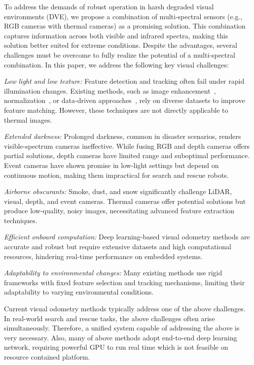 To address the demands of robust operation in harsh degraded visual environments (DVE), we propose a combination of multi-spectral sensors (e.g., RGB cameras with thermal cameras) as a promising solution. This combination captures information across both visible and infrared spectra, making this solution better suited for extreme conditions. Despite the advantages, several challenges must be overcome to fully realize the potential of a multi-spectral combination. In this paper, we address the following key visual challenges:

\textit{Low light and low texture:} Feature detection and tracking often fail under rapid illumination changes. Existing methods, such as image enhancement~\cite{gomez2018learning}, normalization~\cite{buczko2016flow}, or data-driven approaches~\cite{wang2017deepvo}, rely on diverse datasets to improve feature matching. However, these techniques are not directly applicable to thermal images.

\textit{Extended darkness:} Prolonged darkness, common in disaster scenarios, renders visible-spectrum cameras ineffective. While fusing RGB and depth cameras offers partial solutions, depth cameras have limited range and suboptimal performance. Event cameras have shown promise in low-light settings but depend on continuous motion, making them impractical for search and rescue robots.

\textit{Airborne obscurants:} Smoke, dust, and snow significantly challenge LiDAR, visual, depth, and event cameras. Thermal cameras offer potential solutions but produce low-quality, noisy images, necessitating advanced feature extraction techniques.

\textit{Efficient onboard computation:} Deep learning-based visual odometry methods are accurate and robust but require extensive datasets and high computational resources, hindering real-time performance on embedded systems.

\textit{Adaptability to environmental changes:} Many existing methods use rigid frameworks with fixed feature selection and tracking mechanisms, limiting their adaptability to varying environmental conditions.

Current visual odometry methods\cite{wang2017deepvo,teed2021droid,yang2020d3vo,xu2024airslam} typically address one of the above challenges. In real-world search and rescue tasks, the above challenges often arise simultaneously. Therefore, a unified system capable of addressing the above is very necessary. Also, many of above methods\cite{teed2021droid,yang2020d3vo} adopt end-to-end deep learning network, requiring powerful GPU to run real time which is not feasible on resource contained platform.   



